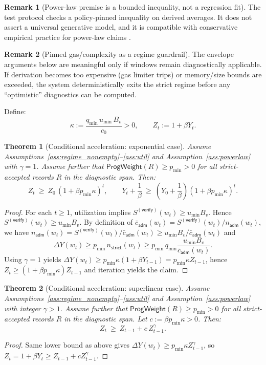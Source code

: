 \documentclass[11pt]{article}
\newcommand{\1}{\mathbf{1}}
\theoremstyle{definition}
\newtheorem{remark}{Remark}
\theoremstyle{plain}
\newtheorem{theorem}{Theorem}
\begin{document}
\begin{remark}[Power-law premise is a bounded inequality, not a regression fit]
The test protocol checks a policy-pinned inequality on derived averages. It does not assert a universal generative model, and it is compatible with conservative empirical practice for power-law claims \cite{ClausetShaliziNewman2009}.
\end{remark}

\begin{remark}[Pinned gas/complexity as a regime guardrail]
The envelope arguments below are meaningful only if windows remain diagnostically applicable. If derivation becomes too expensive (gas limiter trips) or memory/size bounds are exceeded, the system deterministically exits the strict regime before any ``optimistic'' diagnostics can be computed.
\end{remark}

Define:
\[
\kappa := \frac{q_{\min}\,u_{\min}\,B_v}{c_0} > 0,\qquad Z_t:=1+\beta Y_t.
\]

\begin{theorem}[Conditional acceleration: exponential case]
\label{thm:accel_exp}
Assume Assumptions~\ref{ass:regime_nonempty}--\ref{ass:util} and Assumption~\ref{ass:powerlaw} with $\gamma=1$.
Assume further that $\mathsf{ProgWeight}(R)\ge p_{\min}>0$ for all strict-accepted records $R$ in the diagnostic span.
Then:
\[
Z_t \ \ge\ Z_0\,(1+\beta p_{\min} \kappa)^t,
\qquad
Y_t+\frac{1}{\beta}\ \ge\ \left(Y_0+\frac{1}{\beta}\right)(1+\beta p_{\min} \kappa)^t.
\]
\end{theorem}
\begin{proof}
For each $t\ge 1$, utilization implies $S^{(\textsf{verify})}(w_t)\ge u_{\min}B_v$.
Hence $S^{(\textsf{verify})}(w_t)\ge u_{\min}B_v$. By definition of $\bar c_{\textsf{adm}}(w_t)=S^{(\textsf{verify})}(w_t)/n_{\textsf{adm}}(w_t)$, we have $n_{\textsf{adm}}(w_t)=S^{(\textsf{verify})}(w_t)/\bar c_{\textsf{adm}}(w_t)\ge u_{\min}B_v/\bar c_{\textsf{adm}}(w_t)$ and
\[
\Delta Y(w_t)\ge p_{\min}\,n_{\textsf{strict}}(w_t)\ge p_{\min}\,q_{\min}\frac{u_{\min}B_v}{\bar c_{\textsf{adm}}(w_t)}.
\]
Using $\gamma=1$ yields $\Delta Y(w_t)\ge p_{\min}\kappa(1+\beta Y_{t-1})=p_{\min}\kappa Z_{t-1}$, hence
$Z_t\ge (1+\beta p_{\min}\kappa)Z_{t-1}$ and iteration yields the claim.
\end{proof}

\begin{theorem}[Conditional acceleration: superlinear case]
\label{thm:accel_superlinear}
Assume Assumptions~\ref{ass:regime_nonempty}--\ref{ass:util} and Assumption~\ref{ass:powerlaw} with integer $\gamma>1$.
Assume further that $\mathsf{ProgWeight}(R)\ge p_{\min}>0$ for all strict-accepted records $R$ in the diagnostic span.
Let $c:=\beta p_{\min} \kappa>0$. Then:
\[
Z_t \ \ge\ Z_{t-1} + c\,Z_{t-1}^{\gamma}.
\]
\end{theorem}
\begin{proof}
Same lower bound as above gives $\Delta Y(w_t)\ge p_{\min}\kappa Z_{t-1}^{\gamma}$, so
$Z_t=1+\beta Y_t\ge Z_{t-1}+cZ_{t-1}^\gamma$.
\end{proof}
\end{document}
